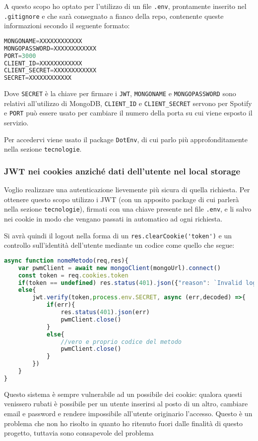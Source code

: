 A questo scopo ho optato per l'utilizzo di un file \verb|.env|, prontamente inserito nel \verb|.gitignore| e che sarà consegnato a fianco della repo, contenente queste informazioni secondo il seguente formato:
\begin{lstlisting}[language=JavaScript]
MONGONAME=XXXXXXXXXXXX
MONGOPASSWORD=XXXXXXXXXXXX
PORT=3000
CLIENT_ID=XXXXXXXXXXXX
CLIENT_SECRET=XXXXXXXXXXXX
SECRET=XXXXXXXXXXXX
\end{lstlisting}
Dove \verb|SECRET| è la chiave per firmare i \verb|JWT|, \verb|MONGONAME| e \verb|MONGOPASSWORD| sono relativi all'utilizzo di MongoDB, \verb|CLIENT_ID| e \verb|CLIENT_SECRET| servono per Spotify e \verb|PORT| può essere usato per cambiare il numero della porta su cui viene esposto il servizio.

Per accedervi viene usato il package \verb|DotEnv|, di cui parlo più approfonditamente nella sezione \verb|tecnologie|.
\subsubsection{JWT nei cookies anziché dati dell'utente nel local storage}
Voglio realizzare una autenticazione lievemente più sicura di quella richiesta. Per ottenere questo scopo utilizzo i JWT (con un apposito package di cui parlerà nella sezione \verb|tecnologie|), firmati con una chiave presente nel file \verb|.env|, e li salvo nei cookie in modo che vengano passati in automatico ad ogni richiesta.

Si avrà quindi il logout nella forma di un \verb|res.clearCookie('token')| e un controllo sull'identità dell'utente mediante un codice come quello che segue:
\begin{lstlisting}[language=JavaScript]
async function nomeMetodo(req,res){
    var pwmClient = await new mongoClient(mongoUrl).connect()
    const token = req.cookies.token
    if(token == undefined) res.status(401).json({"reason": `Invalid login`})
    else{
        jwt.verify(token,process.env.SECRET, async (err,decoded) =>{
            if(err){
                res.status(401).json(err)
                pwmClient.close()
            }
            else{
                //vero e proprio codice del metodo
                pwmClient.close()
            }
        })
    }
}
\end{lstlisting}
\alert{Questo sistema è sempre vulnerabile ad un possibile  dei cookie: qualora questi venissero rubati è possibile per un utente inserirsi al posto di un altro, cambiare email e password e rendere impossibile all'utente originario l'accesso. Questo è un problema che non ho risolto in quanto ho ritenuto fuori dalle finalità di questo progetto, tuttavia sono consapevole del problema}
